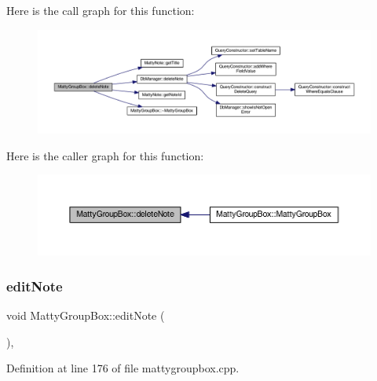 Here is the call graph for this function\+:
\nopagebreak
\begin{figure}[H]
\begin{center}
\leavevmode
\includegraphics[width=350pt]{classMattyGroupBox_ac7b7f1db6ea96e4c4b0f58fb87f86900_cgraph}
\end{center}
\end{figure}
Here is the caller graph for this function\+:
\nopagebreak
\begin{figure}[H]
\begin{center}
\leavevmode
\includegraphics[width=350pt]{classMattyGroupBox_ac7b7f1db6ea96e4c4b0f58fb87f86900_icgraph}
\end{center}
\end{figure}
\hypertarget{classMattyGroupBox_a446df41d130f1d6a411f35d80d62b055}{}\label{classMattyGroupBox_a446df41d130f1d6a411f35d80d62b055} 
\subsubsection{\texorpdfstring{edit\+Note}{editNote}}
{\footnotesize\ttfamily void Matty\+Group\+Box\+::edit\+Note (\begin{DoxyParamCaption}{ }\end{DoxyParamCaption})\hspace{0.3cm}{\ttfamily [private]}, {\ttfamily [slot]}}



Definition at line 176 of file mattygroupbox.\+cpp.

